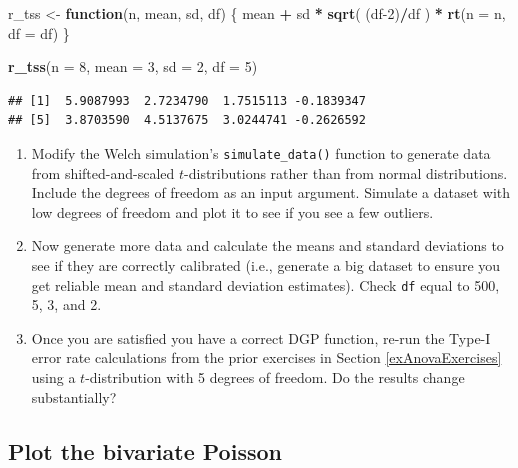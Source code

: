\documentclass[
]{book}
\newenvironment{Shaded}{\begin{snugshade}}{\end{snugshade}}
\newcommand{\AttributeTok}[1]{\textcolor[rgb]{0.13,0.29,0.53}{#1}}
\newcommand{\ControlFlowTok}[1]{\textcolor[rgb]{0.13,0.29,0.53}{\textbf{#1}}}
\newcommand{\DecValTok}[1]{\textcolor[rgb]{0.00,0.00,0.81}{#1}}
\newcommand{\FunctionTok}[1]{\textcolor[rgb]{0.13,0.29,0.53}{\textbf{#1}}}
\newcommand{\NormalTok}[1]{#1}
\newcommand{\OtherTok}[1]{\textcolor[rgb]{0.56,0.35,0.01}{#1}}
\newcommand{\SpecialCharTok}[1]{\textcolor[rgb]{0.81,0.36,0.00}{\textbf{#1}}}
\begin{document}
\begin{Shaded}
\begin{Highlighting}[]
\NormalTok{r\_tss }\OtherTok{\textless{}{-}} \ControlFlowTok{function}\NormalTok{(n, mean, sd, df) \{}
\NormalTok{  mean }\SpecialCharTok{+}\NormalTok{ sd }\SpecialCharTok{*} \FunctionTok{sqrt}\NormalTok{( (df}\DecValTok{{-}2}\NormalTok{)}\SpecialCharTok{/}\NormalTok{df ) }\SpecialCharTok{*} \FunctionTok{rt}\NormalTok{(}\AttributeTok{n =}\NormalTok{ n, }\AttributeTok{df =}\NormalTok{ df)}
\NormalTok{\}}

\FunctionTok{r\_tss}\NormalTok{(}\AttributeTok{n =} \DecValTok{8}\NormalTok{, }\AttributeTok{mean =} \DecValTok{3}\NormalTok{, }\AttributeTok{sd =} \DecValTok{2}\NormalTok{, }\AttributeTok{df =} \DecValTok{5}\NormalTok{)}
\end{Highlighting}
\end{Shaded}

\begin{verbatim}
## [1]  5.9087993  2.7234790  1.7515113 -0.1839347
## [5]  3.8703590  4.5137675  3.0244741 -0.2626592
\end{verbatim}

\begin{enumerate}
\def\labelenumi{\arabic{enumi}.}
\item
  Modify the Welch simulation's \texttt{simulate\_data()} function to generate data from shifted-and-scaled \(t\)-distributions rather than from normal distributions. Include the degrees of freedom as an input argument.
  Simulate a dataset with low degrees of freedom and plot it to see if you see a few outliers.
\item
  Now generate more data and calculate the means and standard deviations to see if they are correctly calibrated (i.e., generate a big dataset to ensure you get reliable mean and standard deviation estimates). Check \texttt{df} equal to 500, 5, 3, and 2.
\item
  Once you are satisfied you have a correct DGP function, re-run the Type-I error rate calculations from the prior exercises in Section \ref{exAnovaExercises} using a \(t\)-distribution with 5 degrees of freedom.
  Do the results change substantially?
\end{enumerate}

\subsection{Plot the bivariate Poisson}\label{plot-the-bivariate-poisson}
\end{document}
